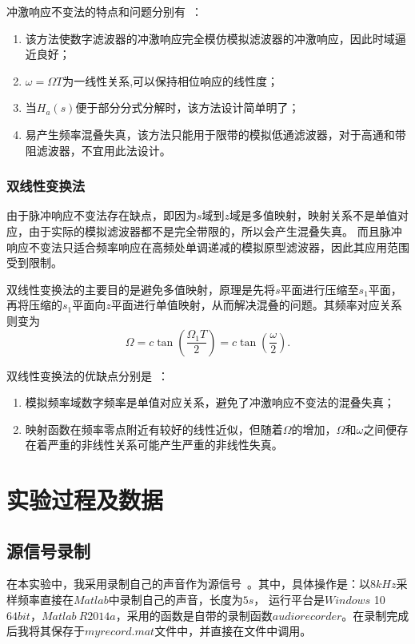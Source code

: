 \documentclass[a4paper,11pt,onecolumn,twoside]{article}
\begin{document}
冲激响应不变法的特点和问题分别有~\supercite{course4}：
\begin{enumerate}
\item 该方法使数字滤波器的冲激响应完全模仿模拟滤波器的冲激响应，因此时域逼近良好；
\item $\omega = \Omega T$为一线性关系,可以保持相位响应的线性度；
\item 当$H_a(s)$便于部分分式分解时，该方法设计简单明了；
\item 易产生频率混叠失真，该方法只能用于限带的模拟低通滤波器，对于高通和带阻滤波器，不宜用此法设计。
\end{enumerate}

\subsubsection{双线性变换法}
由于脉冲响应不变法存在缺点，即因为$s$域到$z$域是多值映射，映射关系不是单值对应，由于实际的模拟滤波器都不是完全带限的，所以会产生混叠失真。
而且脉冲响应不变法只适合频率响应在高频处单调递减的模拟原型滤波器，因此其应用范围受到限制。

双线性变换法的主要目的是避免多值映射，原理是先将$s$平面进行压缩至$s_1$平面，再将压缩的$s_1$平面向$z$平面进行单值映射，从而解决混叠的问题。其频率对应关系则变为
\begin{equation}
\Omega = c \tan (\frac{\Omega_1 T}{2}) = c \tan (\frac{\omega}{2}).
\end{equation}

双线性变换法的优缺点分别是~\supercite{course3}：
\begin{enumerate}
\item 模拟频率域数字频率是单值对应关系，避免了冲激响应不变法的混叠失真；
\item 映射函数在频率零点附近有较好的线性近似，但随着$\Omega$的增加，$\Omega$和$\omega$之间便存在着严重的非线性关系可能产生严重的非线性失真。
\end{enumerate}



\section{实验过程及数据}

\subsection{源信号录制}
在本实验中，我采用录制自己的声音作为源信号~\supercite{ta}。其中，具体操作是：以$8kHz$采样频率直接在$Matlab$中录制自己的声音，长度为$5s$， 运行平台是$Windows$ 10 $64bit$，$Matlab\ R2014a$，采用的函数是自带的录制函数$audiorecorder$。在录制完成后我将其保存于$myrecord.mat$文件中，并直接在文件中调用。
\end{document}
